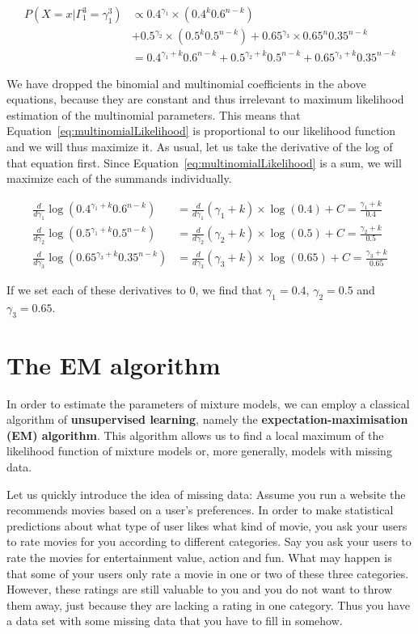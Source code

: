 \begin{align}
P(X=x| \Gamma_{1}^{3}= \gamma_{1}^{3}) &\propto 0.4^{\gamma_{1}} \times (0.4^{k}0.6^{n-k}) \\
&+ 0.5^{\gamma_{2}} \times (0.5^{k}0.5^{n-k}) + 0.65^{\gamma_{3}} \times 0.65^{n}0.35^{n-k} \nonumber \\
&= 0.4^{\gamma_{1}+k}0.6^{n-k} + 0.5^{\gamma_{2}+k}0.5^{n-k} + 0.65^{\gamma_{3}+k}0.35^{n-k} \label{eq:multinomialLikelihood}
\end{align}

We have dropped the binomial and multinomial coefficients in the above equations, because they are constant and thus irrelevant to maximum likelihood estimation
of the multinomial parameters. This means that Equation~\eqref{eq:multinomialLikelihood} is proportional to our likelihood function and we will thus
maximize it. As usual, let us take the derivative of the log of that equation first. Since Equation~\eqref{eq:multinomialLikelihood} is a sum, we will maximize
each of the summands individually.

\begin{align}
\frac{d}{d\gamma_{1}} \log(0.4^{\gamma_{1}+k}0.6^{n-k}) &= \frac{d}{d\gamma_{1}} (\gamma_{1} + k)\times \log(0.4) + C = \frac{\gamma_{1} + k}{0.4} \\
\frac{d}{d\gamma_{2}} \log(0.5^{\gamma_{1}+k}0.5^{n-k}) &= \frac{d}{d\gamma_{2}} (\gamma_{2} + k)\times \log(0.5) + C = \frac{\gamma_{2} + k}{0.5} \\
\frac{d}{d\gamma_{3}} \log(0.65^{\gamma_{3}+k}0.35^{n-k}) &= \frac{d}{d\gamma_{3}} (\gamma_{3} + k)\times \log(0.65) + C = \frac{\gamma_{3} + k}{0.65}
\end{align}

If we set each of these derivatives to 0, we find that $ \gamma_{1} = 0.4 $, $ \gamma_{2} = 0.5 $ and $ \gamma_{3} = 0.65 $.


\section{The EM algorithm}

In order to estimate the parameters of mixture models, we can employ a classical algorithm of 
\textbf{unsupervised learning}, namely the \textbf{expectation-maximisation (EM) algorithm}. This
algorithm allows us to find a local maximum of the likelihood function of mixture models or, more
generally, models with missing data. 

Let us quickly introduce the idea of missing data: Assume you run a website the recommends movies
based on a user's preferences. In order to make statistical predictions about what type of user
likes what kind of movie, you ask your users to rate movies for you according to different categories.
Say you ask your users to rate the movies for entertainment value, action and fun. What may happen is
that some of your users only rate a movie in one or two of these three categories. However, these
ratings are still valuable to you and you do not want to throw them away, just because they are lacking
a rating in one category. Thus you have a data set with some missing data that you have to fill in somehow.

